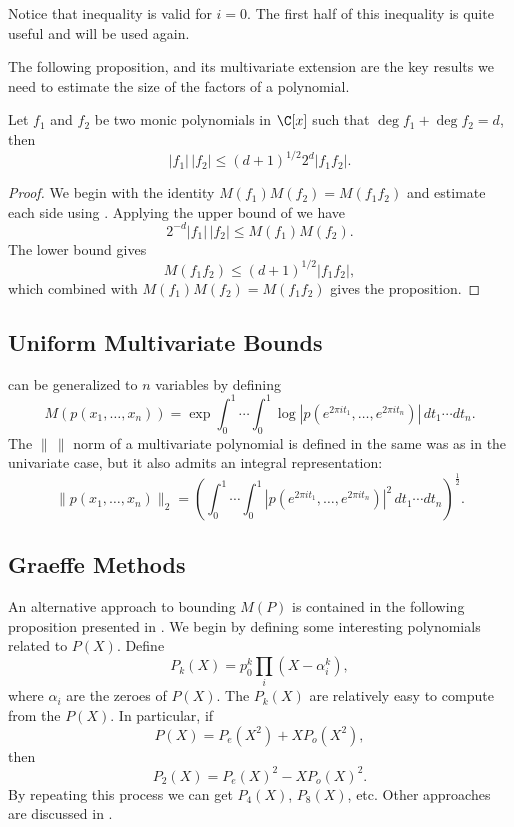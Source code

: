 Notice that inequality  is valid for $i = 0$.
The first half of this inequality is quite useful and will be used
again.

\medskip
The following proposition, and its multivariate extension are the key
results we need to estimate the size of the factors of a polynomial.

\begin{proposition} [{\Gelfond}] \label{Factor:CBound:Prop}
Let $f_{1}$ and $f_{2}$ be two monic polynomials in $\C[x]$ such that
$\deg f_1 + \deg f_2 = d$, then
\[
\left|f_{1}\right|\, \left| f_{2}\right| 
  \le (d+1)^{1/2}2^{d}\left| f_{1} f_{2} \right|.
\]
\end{proposition}

\begin{proof}
We begin with the identity $M(f_{1}) M(f_{2}) = M(f_{1} f_{2})$ and
estimate each side using .  Applying the upper
bound of  we have
\[
2^{-d}\left|f_{1}\right| \,\left|f_{2}\right| \le M(f_{1})M(f_{2}).
\]
The lower bound gives
\[
M(f_{1} f_{2}) \le (d+1)^{1/2} \left| f_{1} f_{2}\right|,
\]
which combined with $M(f_{1}) M(f_{2}) = M(f_{1} f_{2})$ gives the
proposition.
\end{proof}

\subsection{Uniform Multivariate Bounds}

 can be generalized to $n$ variables by defining
\[
M(p(x_{1}, \ldots, x_{n})) = \exp \int_{0}^{1}\cdots \int_{0}^{1} \log
\left|p(e^{2\pi i t_{1}}, \ldots, e^{2\pi i t_{n}})\right| \, dt_{1}
\cdots dt_{n}.
\]
The $\|\,\|$ norm of a multivariate polynomial is defined in the same was
as in the univariate case, but it also admits an integral representation:
\[
\|p(x_{1}, \ldots, x_{n})\|_2 = 
  \left(\int_{0}^{1}\cdots \int_{0}^{1}
    \left|p(e^{2\pi i t_{1}}, \ldots, e^{2\pi i t_{n}})\right|^2
  \, dt_{1} \cdots dt_{n}\right)^{\frac{1}{2}}.
\]

\subsection{Graeffe Methods}
\label{Graeffe:Bound:Sec}

An alternative approach to bounding $M(P)$ is contained in the
following proposition presented in \cite{Cerlienco87}.  We begin by
defining some interesting polynomials related to $P(X)$.  Define
\[
P_k(X) = p_0^k \prod_i \left(X - \alpha_i^k\right),
\]
where $\alpha_i$ are the zeroes of $P(X)$.  The $P_k(X)$ are
relatively easy to compute from the $P(X)$.  In particular, if
\[
P(X) = P_e(X^2) + X P_o(X^2),
\]
then 
\[
P_2(X) = P_e(X)^2 - X P_o(X)^2.
\]
By repeating this process we can get $P_4(X)$, $P_8(X)$, etc.  Other
approaches are discussed in .

